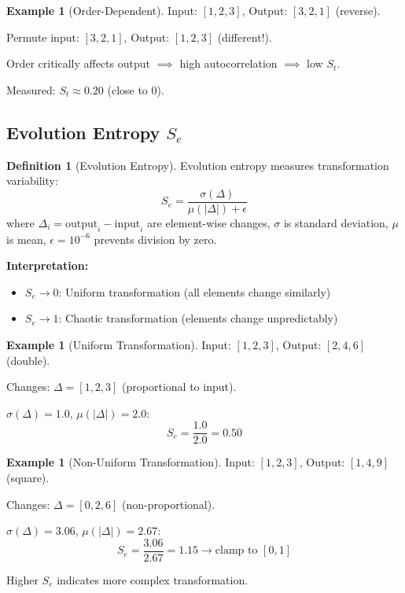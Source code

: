 \documentclass[twocolumn,10pt]{article}
\theoremstyle{definition}
\newtheorem{definition}[theorem]{Definition}
\newtheorem{example}[theorem]{Example}
\theoremstyle{remark}
\newcommand{\St}{S_t}
\newcommand{\Se}{S_e}
\begin{document}
\begin{example}[Order-Dependent]
Input: $[1,2,3]$, Output: $[3,2,1]$ (reverse).

Permute input: $[3,2,1]$, Output: $[1,2,3]$ (different!).

Order critically affects output $\implies$ high autocorrelation $\implies$ low $\St$.

Measured: $\St \approx 0.20$ (close to 0).
\end{example}

\subsection{Evolution Entropy $\Se$}

\begin{definition}[Evolution Entropy]
\label{def:evolution_entropy}
Evolution entropy measures transformation variability:
\begin{equation}
\Se = \frac{\sigma(\Delta)}{\mu(|\Delta|) + \epsilon}
\end{equation}
where $\Delta_i = \text{output}_i - \text{input}_i$ are element-wise changes, $\sigma$ is standard deviation, $\mu$ is mean, $\epsilon = 10^{-6}$ prevents division by zero.
\end{definition}

\noindent\textbf{Interpretation:}
\begin{itemize}
\item $\Se \to 0$: Uniform transformation (all elements change similarly)
\item $\Se \to 1$: Chaotic transformation (elements change unpredictably)
\end{itemize}

\begin{example}[Uniform Transformation]
Input: $[1,2,3]$, Output: $[2,4,6]$ (double).

Changes: $\Delta = [1,2,3]$ (proportional to input).

$\sigma(\Delta) = 1.0$, $\mu(|\Delta|) = 2.0$:
\begin{equation}
\Se = \frac{1.0}{2.0} = 0.50
\end{equation}
\end{example}

\begin{example}[Non-Uniform Transformation]
Input: $[1,2,3]$, Output: $[1,4,9]$ (square).

Changes: $\Delta = [0,2,6]$ (non-proportional).

$\sigma(\Delta) = 3.06$, $\mu(|\Delta|) = 2.67$:
\begin{equation}
\Se = \frac{3.06}{2.67} = 1.15 \to \text{clamp to } [0,1]
\end{equation}

Higher $\Se$ indicates more complex transformation.
\end{example}
\end{document}
